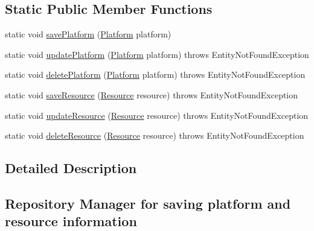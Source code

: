 \subsection*{Static Public Member Functions}
\begin{DoxyCompactItemize}
\item 
static void \hyperlink{classeu_1_1h2020_1_1symbiote_1_1repository_1_1RepositoryManager_a496929533495f38ece4f1c5c8bee4bb4}{save\+Platform} (\hyperlink{classeu_1_1h2020_1_1symbiote_1_1model_1_1Platform}{Platform} platform)
\item 
static void \hyperlink{classeu_1_1h2020_1_1symbiote_1_1repository_1_1RepositoryManager_ab40bbdbdd46c6db2eaa59a615c38cfd0}{update\+Platform} (\hyperlink{classeu_1_1h2020_1_1symbiote_1_1model_1_1Platform}{Platform} platform)  throws Entity\+Not\+Found\+Exception 
\item 
static void \hyperlink{classeu_1_1h2020_1_1symbiote_1_1repository_1_1RepositoryManager_ab7f93e37749010ead2699037d54c4b0d}{delete\+Platform} (\hyperlink{classeu_1_1h2020_1_1symbiote_1_1model_1_1Platform}{Platform} platform)  throws Entity\+Not\+Found\+Exception 
\item 
static void \hyperlink{classeu_1_1h2020_1_1symbiote_1_1repository_1_1RepositoryManager_a82eb799665755be27795dafdfe90e0b3}{save\+Resource} (\hyperlink{classeu_1_1h2020_1_1symbiote_1_1model_1_1Resource}{Resource} resource)  throws Entity\+Not\+Found\+Exception 
\item 
static void \hyperlink{classeu_1_1h2020_1_1symbiote_1_1repository_1_1RepositoryManager_a49626e0b688780c44cac19cf9e3f1a51}{update\+Resource} (\hyperlink{classeu_1_1h2020_1_1symbiote_1_1model_1_1Resource}{Resource} resource)  throws Entity\+Not\+Found\+Exception 
\item 
static void \hyperlink{classeu_1_1h2020_1_1symbiote_1_1repository_1_1RepositoryManager_aa943334bc33d9e5b9a81978558caba89}{delete\+Resource} (\hyperlink{classeu_1_1h2020_1_1symbiote_1_1model_1_1Resource}{Resource} resource)  throws Entity\+Not\+Found\+Exception 
\end{DoxyCompactItemize}


\subsection{Detailed Description}
\subsection*{Repository Manager for saving platform and resource information}

